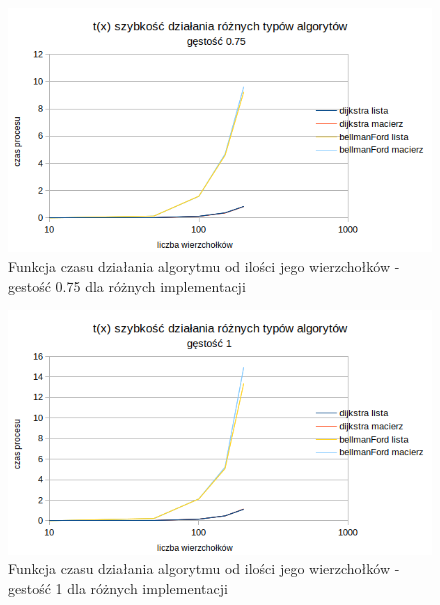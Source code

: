 \documentclass[10pt,a4paper]{article} %
\begin{document}
	\begin{figure}[!ht]
		\centering %
		\includegraphics[scale = 0.9]{dijkstra_bellman_gestosc075.png} %
		\caption{Funkcja czasu działania algorytmu od ilości jego wierzchołków - gestość 0.75 dla różnych implementacji} %
		\label{fig:Obraz6} %
	\end{figure}
	\begin{figure}[!ht]
		\centering %
		\includegraphics[scale = 0.9]{dijkstra_bellman_gestosc1.png} %
		\caption{Funkcja czasu działania algorytmu od ilości jego wierzchołków - gestość 1 dla różnych implementacji} %
		\label{fig:Obraz7} %
	\end{figure}
	
\end{document}
